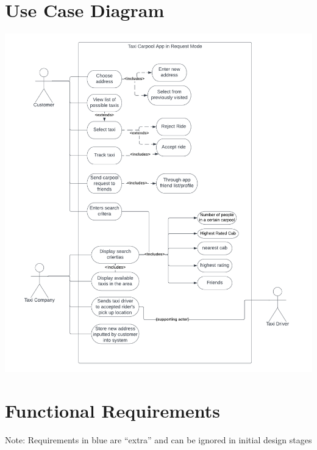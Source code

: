 \documentclass[]{article}
\begin{document}
\section{Use Case Diagram}
\label{sec:use_case_diagram}
\includegraphics[scale = 0.8]{Use_Case_Diagram.png}

\newpage
\section{Functional Requirements}
\label{sec:functional_requirements}

Note: Requirements in blue are ``extra'' and can be ignored in initial design stages\\
\end{document}
